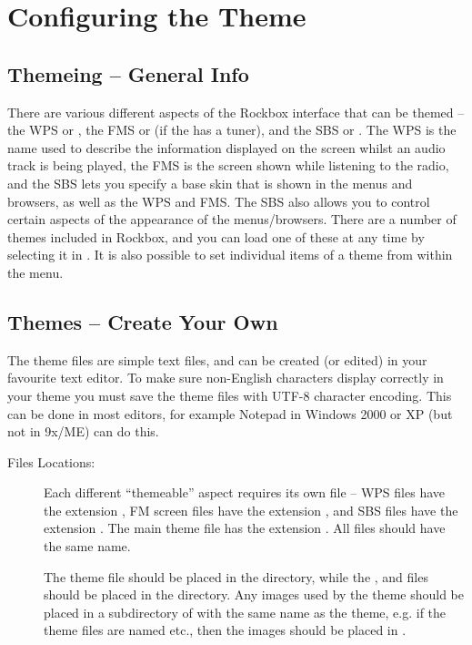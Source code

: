 \section{\label{ref:ConfiguringtheWPS}Configuring the Theme}

\subsection{Themeing -- General Info}

  There are various different aspects of the Rockbox interface
  that can be themed -- the WPS or , the FMS or
   (if the \dap{} has a tuner), and the SBS or
  . The WPS is the name used to
  describe the information displayed on the \daps{} screen whilst an audio
  track is being played, the FMS is the screen shown while listening to the
  radio, and the SBS lets you specify a base skin that is shown in the
  menus and browsers, as well as the WPS and FMS. The SBS also allows you to
  control certain aspects of the appearance of the menus/browsers.
  There are a number of themes included in Rockbox, and
  you can load one of these at any time by selecting it in
  .
  It is also possible to set individual items of a theme from within the
   menu.


\subsection{\label{ref:CreateYourOwnWPS}Themes -- Create Your Own}
The theme files are simple text files, and can be created (or edited) in your
favourite text editor. To make sure non-English characters
display correctly in your theme you must save the theme files with UTF-8
character encoding. This can be done in most editors, for example Notepad in
Windows 2000 or XP (but not in 9x/ME) can do this.

\begin{description}
\item [Files Locations: ] Each different ``themeable'' aspect requires its own file --
  WPS files have the extension , FM screen files have the extension
  , and SBS files have the extension . The main theme
  file has the extension . All files should have the same name.

  The theme  file should be placed in the 
  directory, while the ,  and  files should
  be placed in the  directory. Any images used by the
  theme should be placed in a subdirectory of  with the
  same name as the theme, e.g. if the theme files are named
   etc., then the images should be placed in
  .
\end{description}

